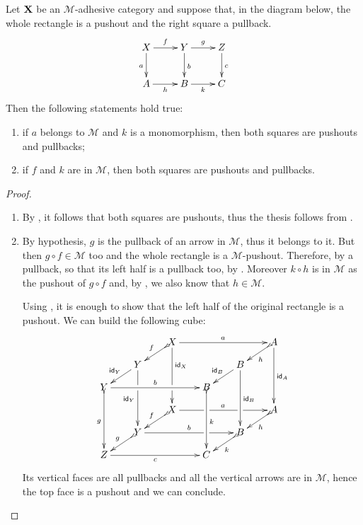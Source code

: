 \begin{lemma}\label{lem:popb} Let $\textbf {\textup{X}}$ be an $\mathcal{M}$-adhesive category  and suppose that, in the diagram below, the whole rectangle is a pushout and the right square a pullback.
\[\xymatrix{X \ar[d]_{a} \ar[r]^{f}& \ar[r]^{g} Y \ar[d]^{b}& Z \ar[d]^{c}\\ A \ar[r]_{h}& B \ar[r]_{k}& C}\]
	Then the following statements hold true:
	\begin{enumerate}
\item if $a$ belongs to $\mathcal{M}$ and $k$ is a monomorphism,  then both squares are pushouts and pullbacks;
\item if $f$ and $k $ are in  $\mathcal{M}$, then both squares are pushouts and pullbacks.
	\end{enumerate}
\end{lemma}
\begin{proof}
\begin{enumerate}
	\item By , it follows that both squares are pushouts, thus the thesis follows from .
	\item By hypothesis, $g$ is the pullback of an arrow in $\mathcal{M}$, thus it belongs to it. But then $g\circ f\in \mathcal{M}$ too  and the whole rectangle is a $\mathcal{M}$-pushout. Therefore, by  a pullback, so that its left half is a pullback too, by . Moreover $k\circ h$ is in $\mathcal{M}$ as the pushout of $g\circ f$ and, by , we also know that $h\in \mathcal{M}$.  
	
	Using , it is enough to show that the left half of the original rectangle is a pushout. We can build the following cube:
	\[\xymatrix@C=20pt@R=10pt{ & &X\ar@{>->}[dl]_{f} \ar[ddd]^(.333333){\id{X}}|(.666666)\hole\ar[rrr]^{a} &&&A \ar[ddd]^{\id{A}} \ar@{>->}[dl]^{h}\\& Y\ar[dl]_{\id{Y}} \ar[ddd]|(.333333)\hole_{\id{Y}} &&&B \ar[ddd]^{\id{B}} \ar[dl]_{\id{B}} \\Y \ar@{>->}[ddd]_{g} \ar[rrr]^{b}&&& B\ar@{>->}[ddd]^{k}\\&&X \ar[rrr]|(.34)\hole^{a}|(.67)\hole \ar@{>->}[dl]_{f}&&& A \ar@{>->}[dl]^{h}\\ & Y \ar[rrr]|(.67)\hole^{b} \ar@{>->}[dl]_{g}&&& B \ar@{>->}[dl]^{k}\\ Z\ar[rrr]_{c} &&& C}\]
	Its vertical faces are all pullbacks and all the vertical arrows are in $\mathcal{M}$, hence the top face is a pushout and we can conclude. \qedhere 
\end{enumerate}
\end{proof}

